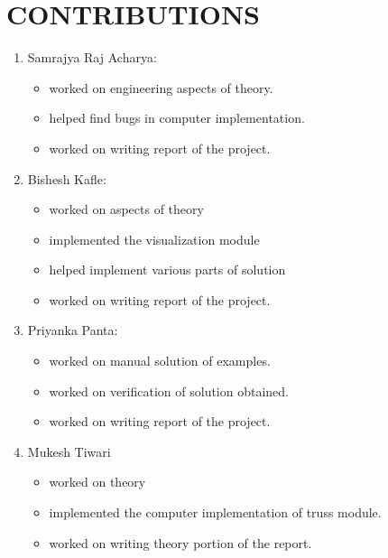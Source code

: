 \chapter*{CONTRIBUTIONS}
	\begin{enumerate}
		\item  Samrajya Raj Acharya:
		   \begin{itemize}
		   \item worked on engineering aspects of theory.
		   \item helped find bugs in computer implementation.  
		   \item  worked on writing report of the project.
		   
		   \end{itemize}
	   
		 \item  Bishesh Kafle:
		 \begin{itemize}
		 	\item worked on aspects of theory
			\item implemented the visualization module
			\item helped implement various parts of solution
		 	\item  worked on writing report of the project.
		 \end{itemize}
		 
		 \item  Priyanka Panta:
		 \begin{itemize}
		 	\item worked on manual solution of examples.
		 	\item worked on verification of solution obtained.
 		 	\item worked on writing report of the project.
		 \end{itemize}
		 
		 
		 \item  Mukesh Tiwari	 
		 \begin{itemize}
		 	\item worked on theory
		 	\item implemented the computer implementation of truss module.
		 	\item  worked on writing theory portion of the report.
		 \end{itemize}
	\end{enumerate}
